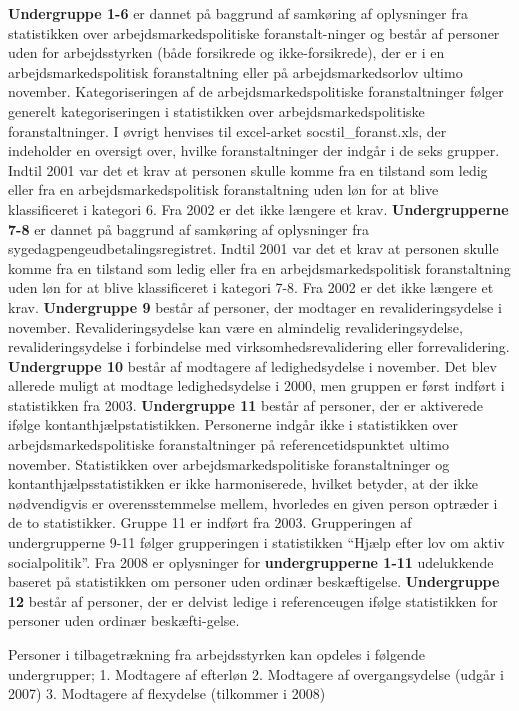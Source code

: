 {\textbf{Undergruppe 1-6} er dannet på baggrund af samkøring af oplysninger fra statistikken over arbejdsmarkedspolitiske foranstalt-ninger og består af personer uden for arbejdsstyrken (både forsikrede og ikke-forsikrede), der er i en arbejdsmarkedspolitisk foranstaltning eller på arbejdsmarkedsorlov ultimo november. Kategoriseringen af de arbejdsmarkedspolitiske foranstaltninger følger generelt kategoriseringen i statistikken over arbejdsmarkedspolitiske foranstaltninger. I øvrigt henvises til excel-arket socstil_foranst.xls, der indeholder en oversigt over, hvilke foranstaltninger der indgår i de seks grupper. Indtil 2001 var det et krav at personen skulle komme fra en tilstand som ledig eller fra en arbejdsmarkedspolitisk foranstaltning uden løn for at blive klassificeret i kategori 6. Fra 2002 er det ikke længere et krav. \textbf{Undergrupperne 7-8} er dannet på baggrund af samkøring af oplysninger fra sygedagpengeudbetalingsregistret. Indtil 2001 var det et krav at personen skulle komme fra en tilstand som ledig eller fra en arbejdsmarkedspolitisk foranstaltning uden løn for at blive klassificeret i kategori 7-8. Fra 2002 er det ikke længere et krav. \textbf{Undergruppe 9} består af personer, der modtager en revalideringsydelse i november. Revalideringsydelse kan være en almindelig revalideringsydelse, revalideringsydelse i forbindelse med virksomhedsrevalidering eller forrevalidering. \textbf{Undergruppe 10} består af modtagere af ledighedsydelse i november. Det blev allerede muligt at modtage ledighedsydelse i 2000, men gruppen er først indført i statistikken fra 2003. \textbf{Undergruppe 11} består af personer, der er aktiverede ifølge kontanthjælpstatistikken. Personerne indgår ikke i statistikken over arbejdsmarkedspolitiske foranstaltninger på referencetidspunktet ultimo november. Statistikken over arbejdsmarkedspolitiske foranstaltninger og kontanthjælpsstatistikken er ikke harmoniserede, hvilket betyder, at der ikke nødvendigvis er overensstemmelse mellem, hvorledes en given person optræder i de to statistikker. Gruppe 11 er indført fra 2003. Grupperingen af undergrupperne 9-11 følger grupperingen i statistikken “Hjælp efter lov om aktiv socialpolitik”. Fra 2008 er oplysninger for \textbf{undergrupperne 1-11} udelukkende baseret på statistikken om personer uden ordinær beskæftigelse. \textbf{Undergruppe 12} består af personer, der er delvist ledige i referenceugen ifølge statistikken for personer uden ordinær beskæfti-gelse.

Personer i tilbagetrækning fra arbejdsstyrken kan opdeles i følgende undergrupper;
1. Modtagere af efterløn
2. Modtagere af overgangsydelse (udgår i 2007)
3. Modtagere af flexydelse (tilkommer i 2008)

}
